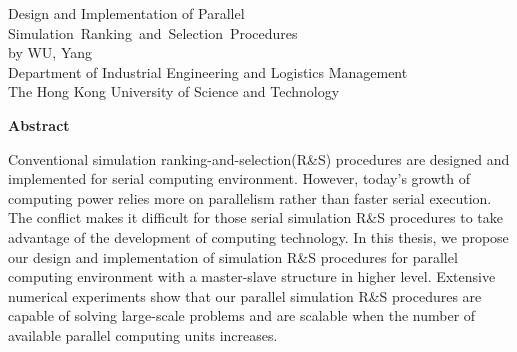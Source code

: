 \begin{center}
{\Large Design and Implementation of Parallel Simulation~Ranking~and~Selection~Procedures}\\
\vspace{20mm}
by WU, Yang\\
Department of Industrial Engineering and Logistics Management\\
The Hong Kong University of Science and Technology
\end{center}
\vspace{8mm}
\begin{center}
\textbf{Abstract}
\end{center}
\par
\noindent

Conventional simulation ranking-and-selection(R\&S) procedures are designed and implemented for serial computing environment. However, today's growth of computing power relies more on parallelism rather than faster serial execution. The conflict makes it difficult for those serial simulation R\&S procedures to take advantage of the development of computing technology. In this thesis, we propose our design and implementation of simulation R\&S procedures for parallel computing environment with a master-slave structure in higher level. Extensive numerical experiments show that our parallel simulation R\&S procedures are capable of solving large-scale problems and are scalable when the number of available parallel computing units increases.
